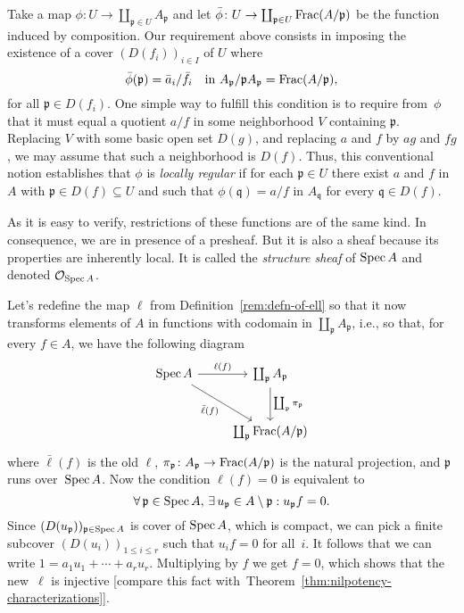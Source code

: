 Take a map $\phi\colon U\to\coprod_{\mathfrak p\in U}A_{\mathfrak p}$ and let $\bar\phi\colon U\to\coprod_{\mathfrak p\in U}
\operatorname{Frac}(A/{\mathfrak p})$ be the function induced by composition. Our requirement above consists in imposing the existence of a cover $(D(f_i))_{i\in I}$ of $U$ where
$$
    \bar\phi(\mathfrak p)
        =\bar a_i/\bar f_i\quad\text{in }
            A_{\mathfrak p}/\mathfrak pA_{\mathfrak p}
            = \operatorname{Frac}(A/\mathfrak p),
$$
for all $\mathfrak p\in D(f_i)$. One simple way to fulfill this condition is to require from~$\phi$ that it must equal a quotient $a/f$ in some neighborhood $V$ containing $\mathfrak p$. Replacing $V$ with some basic open set $D(g)$, and replacing $a$ and $f$ by $ag$ and $fg$, we may assume that such a neighborhood is $D(f)$. Thus, this conventional notion establishes that $\phi$ is \textsl{locally regular} if for each $\mathfrak p\in U$ there exist $a$ and $f$ in $A$ with $\mathfrak p\in D(f)\subseteq U$ and such that $\phi(\mathfrak q)=a/f$ in $A_\mathfrak q$ for every $\mathfrak q\in D(f)$.

As it is easy to verify, restrictions of these functions are of the same kind. In consequence, we are in presence of a presheaf. But it is also a sheaf because its properties are inherently local. It is called the \textsl{structure sheaf} of $\operatorname{Spec} A$ and denoted $\mathcal O_{\operatorname{Spec} A}$.

\begin{rem}
    Let's redefine the map $\ell$ from Definition~\ref{rem:defn-of-ell} so that it now transforms elements of $A$ in functions with codomain in $\coprod_{\mathfrak p}A_{\mathfrak p}$, i.e., so that, for every $f\in A$, we have the following diagram
    $$
        \begin{tikzcd}[row sep=large]
            \Spec A
                    \arrow[r,"\ell(f)"]
                    \arrow[rd,"\bar\ell(f)"']
                &\coprod_{\mathfrak p}A_{\mathfrak p}
                    \arrow[d,"\coprod_{\mathfrak p}\pi_{\mathfrak p}"]\\
                &\coprod_{\mathfrak p}\Frac(A/\mathfrak p)
        \end{tikzcd}
    $$
    where $\bar\ell(f)$ is the old $\ell$, $\pi_{\mathfrak p}\colon A_{\mathfrak p}\to\operatorname{Frac}(A/\mathfrak p)$ is the natural projection, and $\mathfrak p$ runs over~$\operatorname{Spec} A$.  Now the condition $\ell(f)=0$ is equivalent to
    $$
        \forall\,\mathfrak p\in\operatorname{Spec} A,\,
            \exists\, u_{\mathfrak p}\in A\setminus\mathfrak p:
                u_{\mathfrak p}f=0.
    $$
    Since $(D(u_{\mathfrak p}))_{\mathfrak p\in\operatorname{Spec} A}$ is cover of $\operatorname{Spec} A$, which is compact, we can pick a finite subcover $(D(u_i))_{1\le i\le r}$ such that $u_if=0$ for all~$i$. It follows that we can write $1=a_1u_1+\cdots+a_ru_r$. Multiplying by $f$ we get $f=0$, which shows that the new~$\ell$ is injective [compare this fact with~Theorem~\ref{thm:nilpotency-characterizations}].
\end{rem}

